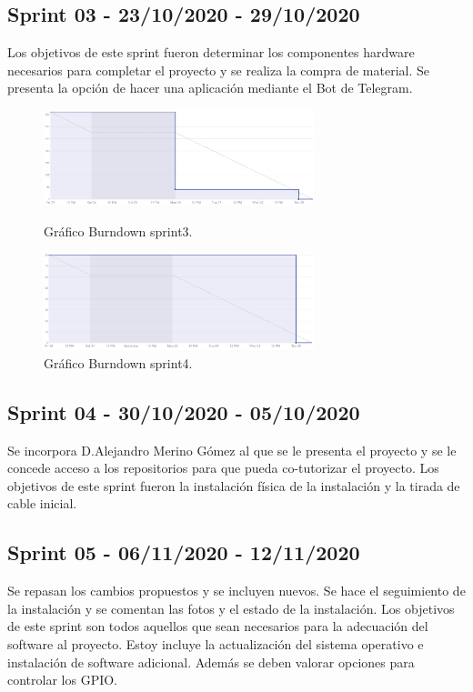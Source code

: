 \subsection{Sprint 03 - 23/10/2020 - 29/10/2020}
Los objetivos de este sprint fueron determinar los componentes hardware necesarios para completar el proyecto y se realiza la compra de material.
Se presenta la opción de hacer una aplicación mediante el Bot de Telegram.

\begin{figure}
    \centering
    \includegraphics[width=0.7\textwidth]{img/BurnDown/3.PNG}
    \caption{Gráfico Burndown sprint3. } \label{BD3}
    \includegraphics[width=0.7\textwidth]{img/BurnDown/4.PNG}
    \caption{Gráfico Burndown sprint4. } \label{BD4}
\end{figure}

\subsection{Sprint 04 - 30/10/2020 - 05/10/2020}
Se incorpora D.Alejandro Merino Gómez al que se le presenta el proyecto y se le concede acceso a los repositorios para que pueda co-tutorizar el proyecto.
Los objetivos de este sprint fueron la instalación física de la instalación y la tirada de cable inicial.


\subsection{Sprint 05 - 06/11/2020 - 12/11/2020}
Se repasan los cambios propuestos y se incluyen nuevos. Se hace el seguimiento de la instalación y se comentan las fotos y el estado de la instalación.
Los objetivos de este sprint son todos aquellos que sean necesarios para la adecuación del software al proyecto. Estoy incluye la actualización del sistema operativo e instalación de software adicional. Además se deben valorar opciones para controlar los GPIO.

